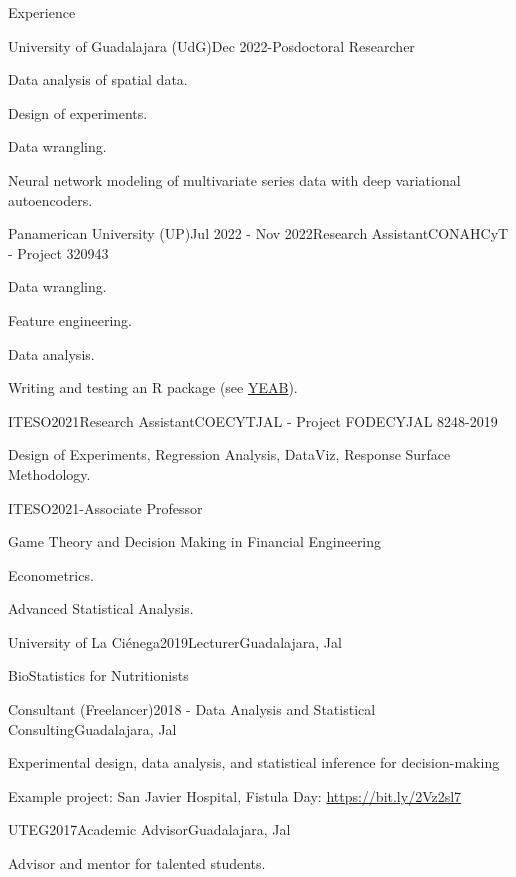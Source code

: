 \documentclass{resume} %
\begin{document}
\begin{rSection}{Experience}

\begin{rSubsection}{University of Guadalajara (UdG)}{Dec 2022-}{Posdoctoral Researcher}{}

\item Data analysis of spatial data.
\item Design of experiments.
\item Data wrangling.
\item Neural network modeling of multivariate series data with deep variational autoencoders.
\end{rSubsection}

\begin{rSubsection}{Panamerican University (UP)}{Jul 2022 - Nov 2022}{Research Assistant}{CONAHCyT - Project 320943}

\item Data wrangling.
\item Feature engineering.
\item Data analysis.
\item Writing and testing an R package (see \href{https://github.com/jealcalat/YEAB}{YEAB}).
\end{rSubsection}

\begin{rSubsection}{ITESO}{2021}{Research Assistant}{COECYTJAL - Project FODECYJAL 8248-2019}

\item Design of Experiments, Regression Analysis, DataViz, Response Surface Methodology.
\end{rSubsection}

\begin{rSubsection}{ITESO}{2021-}{Associate Professor}{}
    \item Game Theory and Decision Making in Financial Engineering
    \item Econometrics.
    \item Advanced Statistical Analysis.
\end{rSubsection}

\begin{rSubsection}{University of La Ciénega}{2019}{Lecturer}{Guadalajara, Jal}
\item BioStatistics for Nutritionists
\end{rSubsection}

\begin{rSubsection}{Consultant (Freelancer)}{2018 - }{Data Analysis and Statistical Consulting}{Guadalajara, Jal}
\item Experimental design, data analysis, and statistical inference for decision-making
\item Example project: San Javier Hospital, Fistula Day: \url{https://bit.ly/2Vz2sl7}
\end{rSubsection}

\begin{rSubsection}{UTEG}{2017}{Academic Advisor}{Guadalajara, Jal}
\item Advisor and mentor for talented students.
\end{rSubsection}

\end{rSection}
\end{document}
